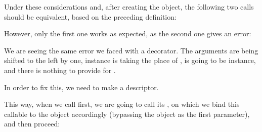 \documentclass[a4paper,10pt,english]{sphinxmanual}
\begin{document}
Under these considerations and, after creating the object, the following two calls should be
equivalent, based on the preceding definition:

\begin{sphinxVerbatim}[commandchars=\\\{\}]
  
  
 
\end{sphinxVerbatim}

However, only the first one works as expected, as the second one gives an error:

\begin{sphinxVerbatim}[commandchars=\\\{\}]
    
    
 
       
\end{sphinxVerbatim}

We are seeing the same error we faced with a decorator. The arguments are being shifted to the left by one,
instance is taking the place of ,  is going to be instance, and there is nothing to provide
for .

In order to fix this, we need to make  a descriptor.

This way, when we call  first, we are going to call its , on
which we bind this callable to the object accordingly (bypassing the object as the first
parameter), and then proceed:
\end{document}
